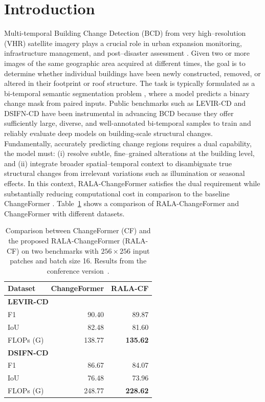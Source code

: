 \documentclass[runningheads]{llncs}
\begin{document}
\section{Introduction}
\label{sec:introduction}

Multi-temporal Building Change Detection (BCD) from very high–resolution (VHR)
satellite imagery plays a crucial role in urban expansion monitoring,
infrastructure management, and post–disaster assessment
\cite{Lu2020SUHI,Daudt2018SiamICIP,Zhang2020FusionNetDSIFN,Hussain2013Review}. Given two or more
images of the same geographic area acquired at different times, the goal is to
determine whether individual buildings have been newly constructed, removed, or
altered in their footprint or roof structure. The task is typically formulated
as a bi-temporal semantic segmentation problem
\cite{Shafique2022Review}, where a model predicts a binary
change mask from paired inputs. Public benchmarks such as LEVIR-CD
\cite{Zheng2020LEVIR} and DSIFN-CD \cite{Zhang2020FusionNetDSIFN} have been instrumental
in advancing BCD because they offer sufficiently large, diverse, and
well-annotated bi-temporal samples to train and reliably evaluate deep models on
building-scale structural changes. Fundamentally, accurately predicting change
regions requires a dual capability, the model must: (i) resolve subtle,
fine–grained alterations at the building level, and (ii) integrate broader
spatial–temporal context to disambiguate true structural changes from irrelevant
variations such as illumination or seasonal effects. In this context,
RALA-ChangeFormer \cite{acuna2026efficient} satisfies the dual requirement while
substantially reducing computational cost in comparison to the baseline
ChangeFormer \cite{Bandara2022ChangeFormer}.
Table~\ref{tab:intro_teaser} shows a comparison of RALA-ChangeFormer and
ChangeFormer with different datasets.

\begin{table}
\centering
\caption{Comparison between ChangeFormer (CF) and the proposed
RALA-ChangeFormer (RALA-CF) on two benchmarks with $256\times256$ input
patches and batch size 16. Results from the conference
version~\cite{acuna2026efficient}.}
\label{tab:intro_teaser}
\begin{tabularx}{\textwidth}{|X|r|r|}
\hline
\textbf{Dataset} & \textbf{ChangeFormer} & \textbf{RALA-CF} \\
\hline
\multicolumn{3}{|l|}{\textbf{LEVIR-CD \cite{Zheng2020LEVIR}}} \\
\hline
F1          & 90.40  & 89.87 \\
IoU         & 82.48  & 81.60 \\
FLOPs (G)   & 138.77 & \textbf{135.62} \\
\hline
\multicolumn{3}{|l|}{\textbf{DSIFN-CD \cite{Zhang2020FusionNetDSIFN}}} \\
\hline
F1          & 86.67  & 84.07 \\
IoU         & 76.48  & 73.96 \\
FLOPs (G)   & 248.77 & \textbf{228.62} \\
\hline
\end{tabularx}
\end{table}
\end{document}
